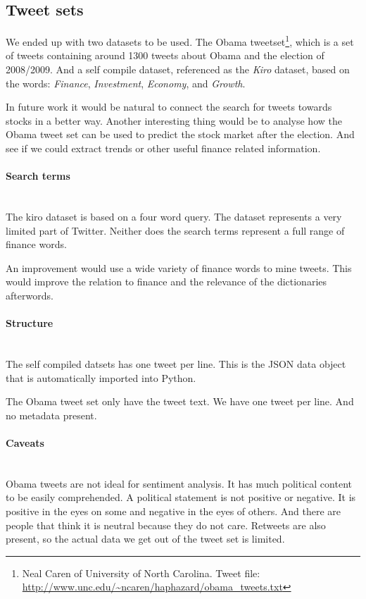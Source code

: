 \subsection{Tweet sets}
We ended up with two datasets to be used. The Obama tweetset\footnote{Neal
Caren of University of North Carolina. Tweet file:
\url{http://www.unc.edu/~ncaren/haphazard/obama_tweets.txt}}, which is a set of
tweets containing around 1300 tweets about Obama and the election of 2008/2009.
And a self compile dataset, referenced as the \textit{Kiro} dataset, based on the words:
\textit{Finance}, \textit{Investment}, \textit{Economy}, and \textit{Growth}. 

In future work it would be natural to connect the search for tweets towards
stocks in a better way. Another interesting thing would be to analyse how the
Obama tweet set can be used to predict the stock market after the election. And
see if we could extract trends or other useful finance related information.  

\paragraph{Search terms}
\hspace{0pt}\\
The kiro dataset is based on a four word query. The dataset represents a very
limited part of Twitter. Neither does the
search terms represent a full range of finance words.

An improvement would use a wide variety of finance words to mine tweets. This
would improve the relation to finance and the relevance of the dictionaries
afterwords. 

\paragraph{Structure}
\hspace{0pt}\\
The self compiled datsets has one tweet per line. This is the JSON data object
that is automatically imported into Python. 

The Obama tweet set only have the tweet text. We have one tweet per line. And
no metadata present. 

\paragraph{Caveats}
\hspace{0pt}\\
Obama tweets are not ideal for sentiment analysis. It has much political
content to be easily comprehended. A political statement is not positive or
negative. It is positive in the eyes on some and negative in the eyes of others.
And there are people that think it is neutral because they do not care. Retweets
are also present, so the actual data we get out of the tweet set is limited. 

